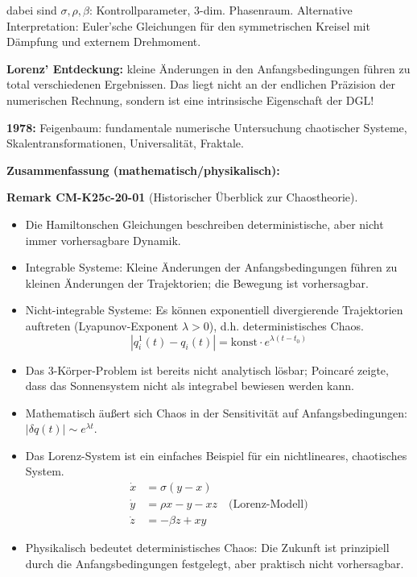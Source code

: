 \documentclass[10pt, letterpaper]{article}
\newcommand{\CustomHeading}[3]{%
  \par\medskip\noindent%
  \textbf{#1 #2} \textnormal{(#3)}.\enskip%
}
\newenvironment{REM}[2]{\begin{unitbox}\CustomHeading{Remark}{#1}{#2}}{\end{unitbox}}
\begin{document}
dabei sind $\sigma, \rho, \beta$: Kontrollparameter, 3-dim. Phasenraum. Alternative Interpretation: Euler'sche Gleichungen für den symmetrischen Kreisel mit Dämpfung und externem Drehmoment.



\textbf{Lorenz' Entdeckung:} kleine Änderungen in den Anfangsbedingungen führen zu total verschiedenen Ergebnissen. Das liegt nicht an der endlichen Präzision der numerischen Rechnung, sondern ist eine intrinsische Eigenschaft der DGL!

\vspace{0.5cm}
\noindent\textbf{1978:} Feigenbaum: fundamentale numerische Untersuchung chaotischer Systeme, Skalentransformationen, Universalität, Fraktale.

\bigskip

\textbf{Zusammenfassung (mathematisch/physikalisch):}
\begin{REM}{CM-K25c-20-01}{Historischer Überblick zur Chaostheorie}
\begin{itemize}
  \item Die Hamiltonschen Gleichungen beschreiben deterministische, aber nicht immer vorhersagbare Dynamik.
  \item Integrable Systeme: Kleine Änderungen der Anfangsbedingungen führen zu kleinen Änderungen der Trajektorien; die Bewegung ist vorhersagbar.
  \item Nicht-integrable Systeme: Es können exponentiell divergierende Trajektorien auftreten (Lyapunov-Exponent $\lambda > 0$), d.h. deterministisches Chaos.
  \[|q^1_i(t) - q_i(t)| = \text{konst} \cdot e^{\lambda(t-t_0)}\]
  \item Das 3-Körper-Problem ist bereits nicht analytisch lösbar; Poincaré zeigte, dass das Sonnensystem nicht als integrabel bewiesen werden kann.
  \item Mathematisch äußert sich Chaos in der Sensitivität auf Anfangsbedingungen: $|\delta q(t)| \sim e^{\lambda t}$.
  \item Das Lorenz-System ist ein einfaches Beispiel für ein nichtlineares, chaotisches System.
  \begin{align*}
\dot{x} &= \sigma(y-x)\\
\dot{y} &= \rho x - y - xz \quad \text{(Lorenz-Modell)}\\
\dot{z} &= -\beta z + xy
\end{align*}
  \item Physikalisch bedeutet deterministisches Chaos: Die Zukunft ist prinzipiell durch die Anfangsbedingungen festgelegt, aber praktisch nicht vorhersagbar.
\end{itemize}
\end{REM}
\end{document}
